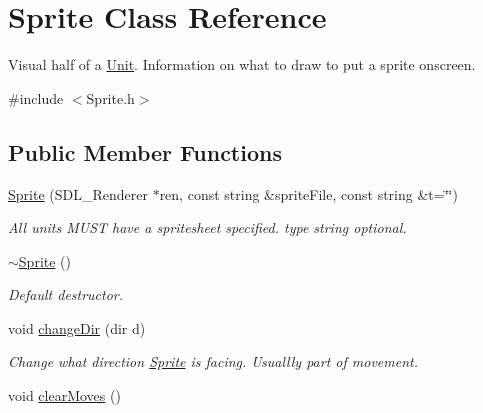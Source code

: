 \hypertarget{class_sprite}{}\section{Sprite Class Reference}
\label{class_sprite}


Visual half of a \hyperlink{class_unit}{Unit}. Information on what to draw to put a sprite onscreen.  




{\ttfamily \#include $<$Sprite.\+h$>$}

\subsection*{Public Member Functions}
\begin{DoxyCompactItemize}
\item 
\hyperlink{class_sprite_a874648e9628df9ca42f3672693adf3a3}{Sprite} (S\+D\+L\+\_\+\+Renderer $\ast$ren, const string \&sprite\+File, const string \&t=\char`\"{}\char`\"{})\hypertarget{class_sprite_a874648e9628df9ca42f3672693adf3a3}{}\label{class_sprite_a874648e9628df9ca42f3672693adf3a3}

\begin{DoxyCompactList}\small\item\em All units M\+U\+ST have a spritesheet specified. type string optional. \end{DoxyCompactList}\item 
\hyperlink{class_sprite_a8accab430f9d90ae5117b57d67e32b84}{$\sim$\+Sprite} ()\hypertarget{class_sprite_a8accab430f9d90ae5117b57d67e32b84}{}\label{class_sprite_a8accab430f9d90ae5117b57d67e32b84}

\begin{DoxyCompactList}\small\item\em Default destructor. \end{DoxyCompactList}\item 
void \hyperlink{class_sprite_a3eadf6ba2634a886862b6e2d9ca93b17}{change\+Dir} (dir d)\hypertarget{class_sprite_a3eadf6ba2634a886862b6e2d9ca93b17}{}\label{class_sprite_a3eadf6ba2634a886862b6e2d9ca93b17}

\begin{DoxyCompactList}\small\item\em Change what direction \hyperlink{class_sprite}{Sprite} is facing. Usuallly part of movement. \end{DoxyCompactList}\item 
void \hyperlink{class_sprite_a1e3c2b2d0d846db9cc8bd948a804dd10}{clear\+Moves} ()\hypertarget{class_sprite_a1e3c2b2d0d846db9cc8bd948a804dd10}{}\label{class_sprite_a1e3c2b2d0d846db9cc8bd948a804dd10}


\end{DoxyCompactItemize}
